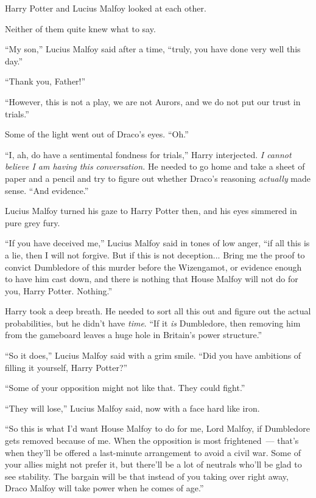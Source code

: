 Harry Potter and Lucius Malfoy looked at each other.

Neither of them quite knew what to say.

``My son,'' Lucius Malfoy said after a time, ``truly, you have done very well this day.''

``Thank you, Father!''

``However, this is not a play, we are not Aurors, and we do not put our trust in trials.''

Some of the light went out of Draco's eyes. ``Oh.''

``I, ah, do have a sentimental fondness for trials,'' Harry interjected. \emph{I cannot believe I am having this conversation.} He needed to go home and take a sheet of paper and a pencil and try to figure out whether Draco's reasoning \emph{actually} made sense. ``And evidence.''

Lucius Malfoy turned his gaze to Harry Potter then, and his eyes simmered in pure grey fury.

``If you have deceived me,'' Lucius Malfoy said in tones of low anger, ``if all this is a lie, then I will not forgive. But if this is not deception... Bring me the proof to convict Dumbledore of this murder before the Wizengamot, or evidence enough to have him cast down, and there is nothing that House Malfoy will not do for you, Harry Potter. Nothing.''

Harry took a deep breath. He needed to sort all this out and figure out the actual probabilities, but he didn't have \emph{time}. ``If it \emph{is} Dumbledore, then removing him from the gameboard leaves a huge hole in Britain's power structure.''

``So it does,'' Lucius Malfoy said with a grim smile. ``Did you have ambitions of filling it yourself, Harry Potter?''

``Some of your opposition might not like that. They could fight.''

``They will lose,'' Lucius Malfoy said, now with a face hard like iron.

``So this is what I'd want House Malfoy to do for me, Lord Malfoy, if Dumbledore gets removed because of me. When the opposition is most frightened~--- that's when they'll be offered a last-minute arrangement to avoid a civil war. Some of your allies might not prefer it, but there'll be a lot of neutrals who'll be glad to see stability. The bargain will be that instead of you taking over right away, Draco Malfoy will take power when he comes of age.''

